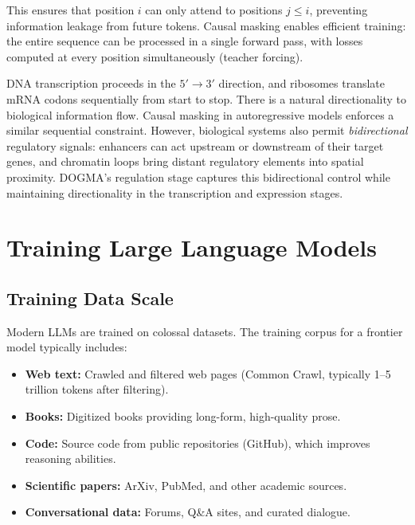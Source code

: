 This ensures that position $i$ can only attend to positions $j \leq i$, preventing information leakage from future tokens. Causal masking enables efficient training: the entire sequence can be processed in a single forward pass, with losses computed at every position simultaneously (teacher forcing).

\begin{keyinsight}
DNA transcription proceeds in the $5' \to 3'$ direction, and ribosomes translate mRNA codons sequentially from start to stop. There is a natural directionality to biological information flow. Causal masking in autoregressive models enforces a similar sequential constraint. However, biological systems also permit \emph{bidirectional} regulatory signals: enhancers can act upstream or downstream of their target genes, and chromatin loops bring distant regulatory elements into spatial proximity. DOGMA's regulation stage captures this bidirectional control while maintaining directionality in the transcription and expression stages.
\end{keyinsight}

\section{Training Large Language Models}
\label{sec:training-llms}

\subsection{Training Data Scale}

Modern LLMs are trained on colossal datasets. The training corpus for a frontier model typically includes:

\begin{itemize}[leftmargin=1.5em]
  \item \textbf{Web text:} Crawled and filtered web pages (Common Crawl, typically 1--5 trillion tokens after filtering).
  \item \textbf{Books:} Digitized books providing long-form, high-quality prose.
  \item \textbf{Code:} Source code from public repositories (GitHub), which improves reasoning abilities.
  \item \textbf{Scientific papers:} ArXiv, PubMed, and other academic sources.
  \item \textbf{Conversational data:} Forums, Q\&A sites, and curated dialogue.
\end{itemize}

